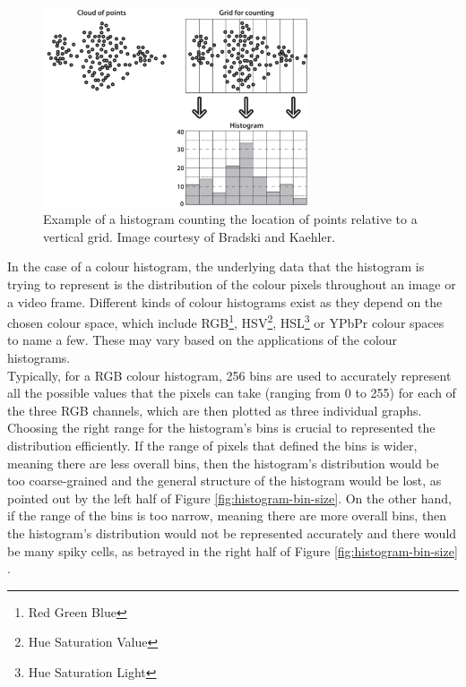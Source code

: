 \begin{figure}[h]
\centerline{\includegraphics[width=0.70\textwidth]{figures/histogram_general_example.png}}
\caption{\label{fig:histogram-general-example}Example of a histogram counting the location of points relative to a vertical grid. Image courtesy of Bradski and Kaehler.}
\end{figure}

In the case of a colour histogram, the underlying data that the histogram is trying to represent is the distribution of the colour pixels throughout an image or a video frame. Different kinds of colour histograms exist as they depend on the chosen colour space, which include RGB\footnote{Red Green Blue}, HSV\footnote{Hue Saturation Value}, HSL\footnote{Hue Saturation Light} or YPbPr colour spaces to name a few. These may vary based on the applications of the colour histograms.\\

Typically, for a RGB colour histogram, 256 bins are used to accurately represent all the possible values that the pixels can take (ranging from 0 to 255) for each of the three RGB channels, which are then plotted as three individual graphs. Choosing the right range for the histogram's bins is crucial to represented the distribution efficiently. If the range of pixels that defined the bins is wider, meaning there are less overall bins, then the histogram's distribution would be too coarse-grained and the general structure of the histogram would be lost, as pointed out by the left half of Figure \ref{fig:histogram-bin-size}. On the other hand, if the range of the bins is too narrow, meaning there are more overall bins, then the histogram's distribution would not be represented accurately and there would be many spiky cells, as betrayed in the right half of Figure \ref{fig:histogram-bin-size} \cite{bradski2008opencv}.

